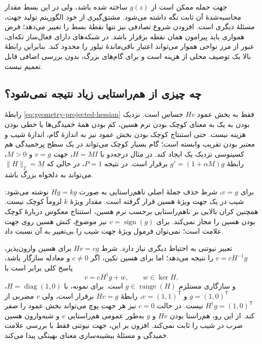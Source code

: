 جهت حمله ممکن است از $g(z)$ ساخته شده باشد، ولی در این بسط مقدار محاسبه‌شدهٔ آن ثابت نگه داشته می‌شود. مشتق‌گیری از خود الگوریتم تولید جهت، مسئلهٔ دیگری است. افزودن شروع تصادفی نیز تنها نقطهٔ بسط را تغییر می‌دهد؛ فرض همواری باید پیرامون همان نقطه برقرار باشد. در شبکه‌های دارای فعال‌ساز تکه‌ای، عبور از مرز نواحی هموار می‌تواند اعتبار باقی‌ماندهٔ تیلور را محدود کند. بنابراین رابطهٔ بالا یک توصیف محلی از هزینه است و برای گام‌های بزرگ، بدون بررسی اضافی قابل تعمیم نیست.

\subsection{چه چیزی از هم‌راستایی زیاد نتیجه نمی‌شود؟}
\label{sec:geometry-limits}

رابطهٔ \eqref{eq:geometry-projected-hessian} فقط به بخش عمود $Hv$ حساس است. نزدیک بودن \pertalign{} به یک به معنای کوچک بودن نرم هسین، کم بودن همهٔ خمیدگی‌ها یا خطی بودن هزینه نیست. حتی استنتاج کوچک بودن بخش عمود نیز به اندازهٔ گام، اندازهٔ شیب و معتبر بودن تقریب وابسته است؛ گام بسیار کوچک می‌تواند در یک سطح پرخمیدگی هم کسینوسی نزدیک یک ایجاد کند. در مثال درجه‌دو با $H=MI$، جهت $v=g$ و $M>0$، رابطهٔ $g'=(1+\alpha M)g$ برقرار است. در نتیجه $P=1$، در حالی که $\|H\|_2=M$ می‌تواند به دلخواه بزرگ باشد.

برای $v=g$، شرط حذف جملهٔ اصلی ناهم‌راستایی به صورت $Hg=kg$ نوشته می‌شود: شیب در یک جهت ویژهٔ هسین قرار گرفته است. مقدار ویژهٔ $k$ لزوماً کوچک نیست. همچنین کران بالایی بر ناهم‌راستایی برحسب نرم هسین، استنتاج معکوس دربارهٔ کوچک بودن هسین را مجاز نمی‌کند. برای $v=\operatorname{sign}(g)$ نیز موضوع، کنش هسین روی جهت علامت است؛ نمی‌توان فرمول ویژهٔ جهت شیب را بی‌تغییر به آن نسبت داد.

تعبیر نیوتنی به احتیاط دیگری نیاز دارد. شرط $Hv=cg$ برای هسین وارون‌پذیر، $v=cH^{-1}g$ را نتیجه می‌دهد؛ اما برای هسین تکین، اگر $c\ne0$ و معادله سازگار باشد، پاسخ کلی برابر است با
\begin{equation}
v=cH^\dagger g+w,\qquad w\in\ker H,
\label{eq:geometry-pseudoinverse}
\end{equation}
و سازگاری مستلزم $g\in\operatorname{range}(H)$ است. برای نمونه، با $H=\operatorname{diag}(1,0)$، $g=(1,0)^{\mathsf T}$ و $v=(1,1)^{\mathsf T}$، رابطهٔ $Hv=g$ برقرار است، ولی $v$ مضربی از $H^\dagger g=(1,0)^{\mathsf T}$ نیست. در حالت $c=0$ نیز هر جهت پوچ می‌تواند بخش عمود را صفر کند. از این رو، هم‌راستا بودن $Hv$ و $g$ به‌طور عمومی هم‌راستایی $v$ و شبه‌وارون هسین ضرب در شیب را ثابت نمی‌کند. افزون بر این، جهت نیوتنی فقط با بررسی علامت خمیدگی و مسئلهٔ بیشینه‌سازی معنای بهینگی پیدا می‌کند.

